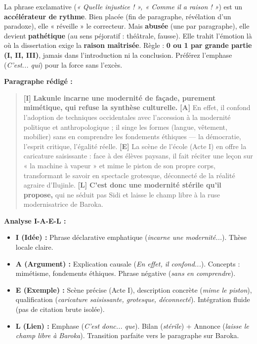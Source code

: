 \documentclass[11pt]{article}
\begin{document}
\begin{savaistu}
La phrase exclamative (\emph{« Quelle injustice ! », « Comme il a raison ! »}) est un \textbf{accélérateur de rythme}. Bien placée (fin de paragraphe, révélation d'un paradoxe), elle « réveille » le correcteur. Mais \textbf{abusée} (une par paragraphe), elle devient \textbf{pathétique} (au sens péjoratif : théâtrale, fausse). Elle trahit l'émotion là où la dissertation exige la \textbf{raison maîtrisée}. Règle : \textbf{0 ou 1 par grande partie (I, II, III)}, jamais dans l'introduction ni la conclusion. Préférez l'emphase (\emph{C'est... qui}) pour la force sans l'excès.
\end{savaistu}

\begin{exemplebox}
\textbf{Paragraphe rédigé :}
\begin{quote}
\textbf{[I]} \textbf{Lakunle incarne une modernité de façade, purement mimétique, qui refuse la synthèse culturelle.} \textbf{[A]} En effet, il confond l'adoption de techniques occidentales avec l'accession à la modernité politique et anthropologique ; il singe les formes (langue, vêtement, mobilier) sans en comprendre les fondements éthiques — la démocratie, l'esprit critique, l'égalité réelle. \textbf{[E]} La scène de l'école (Acte I) en offre la caricature saisissante : face à des élèves paysans, il fait réciter une leçon sur « la machine à vapeur » et mime le piston de son propre corps, transformant le savoir en spectacle grotesque, déconnecté de la réalité agraire d'Ilujinle. \textbf{[L]} \textbf{C'est donc une modernité stérile qu'il propose,} qui ne séduit pas Sidi et laisse le champ libre à la ruse modernisatrice de Baroka.
\end{quote}
\textbf{Analyse I-A-E-L :}
\begin{itemize}
    \item \textbf{I (Idée) :} Phrase déclarative emphatique (\emph{incarne une modernité...}). Thèse locale claire.
    \item \textbf{A (Argument) :} Explication causale (\emph{En effet, il confond...}). Concepts : mimétisme, fondements éthiques. Phrase négative (\emph{sans en comprendre}).
    \item \textbf{E (Exemple) :} Scène précise (Acte I), description concrète (\emph{mime le piston}), qualification (\emph{caricature saisissante, grotesque, déconnecté}). Intégration fluide (pas de citation brute isolée).
    \item \textbf{L (Lien) :} Emphase (\emph{C'est donc... que}). Bilan (\emph{stérile}) + Annonce (\emph{laisse le champ libre à Baroka}). Transition parfaite vers le paragraphe sur Baroka.
\end{itemize}
\end{exemplebox}
\end{document}
